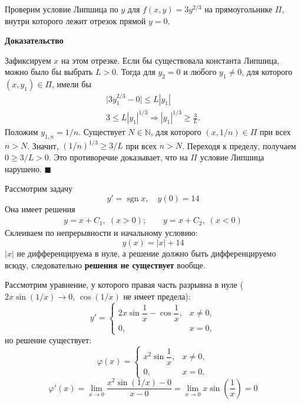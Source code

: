 \documentclass[12pt,a4paper]{article}
\numberwithin{equation}{section}
\DeclareMathOperator{\sgn}{sgn}
\renewenvironment{proof}[1][Доказательство]{\begin{center}\textbf{#1}\end{center}}{\hfill$\blacksquare$\par}
\begin{document}
Проверим условие Липшица по \(y\) для \(f(x,y)=3y^{2/3}\) на
прямоугольнике \(\Pi\), внутри которого лежит отрезок прямой \(y=0\).
\begin{center}
\end{center}
\begin{proof}
Зафиксируем \(x\) на этом отрезке. Если бы существовала константа
Липшица, можно было бы выбрать \(L>0\). Тогда для \(y_2=0\)
и любого \(y_1\ne0\), для которого \((x,y_1)\in\Pi\), имели бы
\begin{gather*}
\bigl|3y_1^{2/3}-0\bigr|\le L|y_1|\\
3\le L|y_1|^{1/3}\Longrightarrow |y_1|^{1/3}\ge\frac{3}{L}.
\end{gather*}
Положим \(y_{1,n}=1/n\). Существует \(N\in\mathbb N\), для которого
\((x,1/n)\in\Pi\) при всех \(n>N\). Значит, \((1/n)^{1/3}\ge 3/L\)
при всех \(n>N\). Переходя к пределу, получаем \(0\ge 3/L>0\).
Это противоречие доказывает, что на \(\Pi\) условие Липшица нарушено.
\end{proof}

\begin{exampleHSE}
Рассмотрим задачу
\[y'=\sgn x,\quad y(0)=14\]
Она имеет решения
\begin{gather*}
y=x+C_1,\;(x>0);\qquad y=x+C_2,\;(x<0)
\end{gather*}
Склеиваем по непрерывности и начальному условию:
\[y(x)=|x|+14\]
\(|x|\) не дифференцируема в нуле, а решение должно быть дифференцируемо всюду, следовательно \textbf{решения не существует} вообще.
\end{exampleHSE}

\begin{exampleHSE}
Рассмотрим уравнение, у которого правая часть разрывна в нуле (\(2x\sin(1/x)\rightarrow0\), \(\cos(1/x)\) не имеет предела):
\[
y'=
\begin{cases}
 2x\sin\dfrac1x-\cos\dfrac1x,&x\neq0,\\
 0,&x=0,
\end{cases}
\]
но решение существует:
\[
\varphi(x)=
\begin{cases}
 x^2\sin\dfrac1x,&x\neq0,\\
 0,&x=0.
\end{cases}
\]
\[\varphi'(x)=\lim_{x\rightarrow0}\frac{x^2\sin(1/x)-0}{x-0}=\lim_{x\rightarrow0}x\sin\left(\frac{1}{x}\right)=0\]
\end{exampleHSE}
\end{document}
